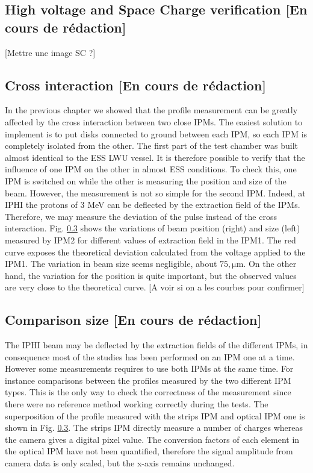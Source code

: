 \begin{refsection}
  \subsection{High voltage and Space Charge verification [En cours de rédaction]}
  [Mettre une image SC ?]

  

  \subsection{Cross interaction [En cours de rédaction]}

  In the previous chapter we showed that the profile measurement can be greatly affected by the cross interaction between two close IPMs. The easiest solution to implement is to put disks connected to ground between each IPM, so each IPM is completely isolated from the other. The first part of the test chamber was built almost identical to the ESS LWU vessel. It is therefore possible to verify that the influence of one IPM on the other in almost ESS conditions. To check this, one IPM is switched on while the other is measuring the position and size of the beam. However, the measurement is not so simple for the second IPM. Indeed, at IPHI the protons of 3 MeV can be deflected by the extraction field of the IPMs. Therefore, we may measure the deviation of the pulse instead of the cross interaction. Fig. \ref{} shows the variations of beam position (right) and size (left) measured by IPM2 for different values of extraction field in the IPM1. The red curve exposes the theoretical deviation calculated from the voltage applied to the IPM1. The variation in beam size seems negligible, about $75,\mathrm{\mu m}$. On the other hand, the variation for the position is quite important, but the observed values are very close to the theoretical curve.
  [A voir si on a les courbes pour confirmer]

  

  \subsection{Comparison size [En cours de rédaction]}
  The IPHI beam may be deflected by the extraction fields of the different IPMs, in consequence most of the studies has been performed on an IPM one at a time. However some measurements requires to use both IPMs at the same time. For instance comparisons between the profiles measured by the two different IPM types. This is the only way to check the correctness of the measurement since there were no reference method working correctly during the tests.
  The superposition of the profile measured with the strips IPM and optical IPM one is shown in Fig. \ref{}. The strips IPM directly measure a number of charges whereas the camera gives a digital pixel value. The conversion factors of each element in the optical IPM have not been quantified, therefore the signal amplitude from camera data is only scaled, but the x-axis remains unchanged.


\end{refsection}

